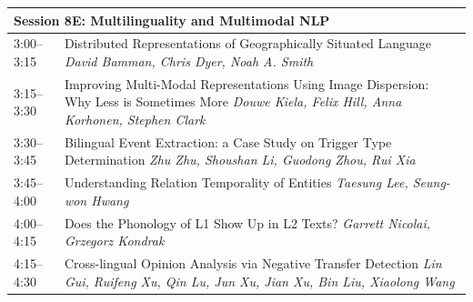 \documentclass{book}
\renewcommand{\large}{\fontsize{36}{40}\selectfont}
\begin{document}
\begin{tabular}{p{3in}p{16in}}
  \multicolumn{2}{l}{\bfseries\large Session 8E: Multilinguality and Multimodal NLP} \\\hline

    
    3:00--3:15
    &	Distributed Representations of Geographically Situated Language \newline 
    {\itshape David Bamman, Chris Dyer, Noah A. Smith} \\
    
    3:15--3:30
    &	Improving Multi-Modal Representations Using Image Dispersion: Why Less is Sometimes More \newline 
    {\itshape Douwe Kiela, Felix Hill, Anna Korhonen, Stephen Clark} \\
    
    3:30--3:45
    &	Bilingual Event Extraction: a Case Study on Trigger Type Determination \newline 
    {\itshape Zhu Zhu, Shoushan Li, Guodong Zhou, Rui Xia} \\
    
    3:45--4:00
    &	Understanding Relation Temporality of Entities \newline 
    {\itshape Taesung Lee, Seung-won Hwang} \\
    
    4:00--4:15
    &	Does the Phonology of L1 Show Up in L2 Texts? \newline 
    {\itshape Garrett Nicolai, Grzegorz Kondrak} \\
    
    4:15--4:30
    &	Cross-lingual Opinion Analysis via Negative Transfer Detection \newline 
    {\itshape Lin Gui, Ruifeng Xu, Qin Lu, Jun Xu, Jian Xu, Bin Liu, Xiaolong Wang} \\
    
\end{tabular}
\end{document}
